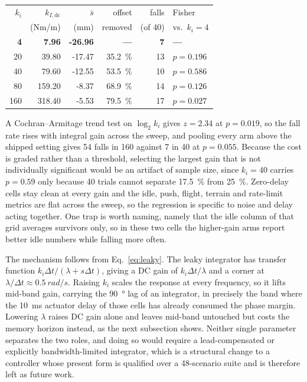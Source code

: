 \documentclass[a4paper,fleqn]{cas-dc}
\begin{document}
\begin{center}\footnotesize
\begin{tabular}{rrrrrl}
\hline
$k_i$ & $k_{I,\text{dc}}$ & $\bar{s}$ & offset & falls & Fisher \\
 & (Nm/m) & (mm) & removed & (of 40) & vs.\ $k_i{=}4$ \\
\hline
\textbf{4} & \textbf{7.96} & \textbf{-26.96} & \textbf{---} & \textbf{7} & \textbf{---} \\
20 & 39.80 & -17.47 & \SI{35.2}{\percent} & 13 & $p{=}0.196$ \\
40 & 79.60 & -12.55 & \SI{53.5}{\percent} & 10 & $p{=}0.586$ \\
80 & 159.20 & -8.37 & \SI{68.9}{\percent} & 14 & $p{=}0.126$ \\
160 & 318.40 & -5.53 & \SI{79.5}{\percent} & 17 & $p{=}0.027$ \\
\hline
\end{tabular}
\end{center}

A Cochran--Armitage trend test on $\log_2 k_i$ gives $z{=}2.34$ at $p{=}0.019$,
so the fall rate rises with integral gain across the sweep, and pooling every
arm above the shipped setting gives \num{54} falls in \num{160} against \num{7}
in \num{40} at $p{=}0.055$. Because the cost is graded rather than a threshold,
selecting the largest gain that is not individually significant would be an
artifact of sample size, since $k_i{=}40$ carries $p{=}0.59$ only because
\num{40} trials cannot separate \SI{17.5}{\percent} from \SI{25}{\percent}.
Zero-delay cells stay clean at every gain and the idle, push, flight, terrain
and rate-limit metrics are flat across the sweep, so the regression is specific
to noise and delay acting together. One trap is worth naming, namely that the
idle column of that grid averages survivors only, so in these
two cells the higher-gain arms report better idle numbers while falling more
often.

The mechanism follows from Eq.~\eqref{eq:leaky}. The leaky integrator has
transfer function $k_i\Delta t/(\lambda + s\Delta t)$, giving a DC gain of
$k_i\Delta t/\lambda$ and a corner at $\lambda/\Delta t\approx\SI{0.5}{rad/s}$.
Raising $k_i$ scales the response at every frequency, so it lifts mid-band gain,
carrying the \SI{90}{\degree} lag of an integrator, in precisely the band where
the \SI{10}{ms} actuator delay of those cells has already consumed the phase
margin. Lowering $\lambda$ raises DC gain alone and leaves mid-band untouched
but costs the memory horizon instead, as the next subsection shows. Neither
single parameter separates the two roles, and doing so would require a
lead-compensated or explicitly bandwidth-limited integrator, which is a
structural change to a controller whose present form is qualified over a
\num{48}-scenario suite and is therefore left as future work.
\end{document}
